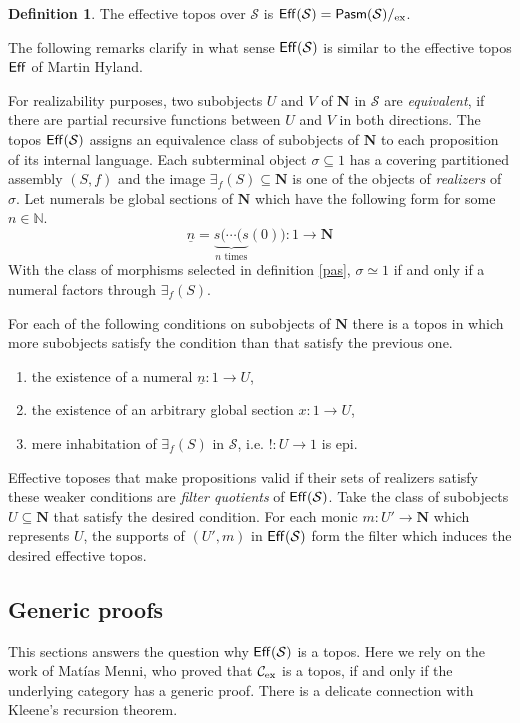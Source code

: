 \documentclass{amsart}
\theoremstyle{plain}
\theoremstyle{definition}
\newtheorem{defin}[theorem]{Definition}
\newcommand\hide[1]{}
\newcommand\cat\mathcal
\newcommand\XN{\mathbb N}
\newcommand\N{\mathbf N}
\begin{document}
\begin{defin} The effective topos over $\cat S$ is $\Eff(\cat S) = \pasm(\cat S)/\ex$. \end{defin}

The following remarks clarify in what sense $\Eff(\cat S)$ is similar to the effective topos $\mathsf{Eff}$ of Martin Hyland.

For realizability purposes, two subobjects $U$ and $V$ of $\N$ in $\cat S$ are \emph{equivalent}, if there are partial recursive functions between $U$ and $V$ in both directions. The topos $\Eff(\cat S)$ assigns an equivalence class of subobjects of $\N$ to each proposition of its internal language. Each subterminal object $\sigma\subseteq 1$ has a covering partitioned assembly $(S,f)$ and the image $\exists_f(S)\subseteq \N$ is one of the objects of \emph{realizers} of $\sigma$. Let numerals be global sections of $\N$ which have the following form for some $n\in \XN$. 
\[ \underline n = \underbrace{s(\dotsm(s}_{n\textrm{ times}}(0)):1\to \N \]
With the class of morphisms selected in definition \ref{pas}, $\sigma \simeq 1$ if and only if a numeral factors through $\exists_f(S)$.

For each of the following conditions on subobjects of $\N$ there is a topos in which more subobjects satisfy the condition than that satisfy the previous one.
\begin{enumerate}
\item the existence of a numeral $\underline n:1\to U$,  
\item the existence of an arbitrary global section $x:1\to U$,
\item mere inhabitation of $\exists_f(S)$ in $\cat S$, i.e. $!:U\to 1$ is epi.
\end{enumerate}

Effective toposes that make propositions valid if their sets of realizers satisfy these weaker conditions are \emph{filter quotients} of $\Eff(\cat S)$. %
Take the class of subobjects $U\subseteq \N$ that satisfy the desired condition. For each monic $m:U'\to \N$ which represents $U$, the supports of $(U',m)$ in $\Eff(\cat S)$ form the filter which induces the desired effective topos. %
\hide{global section behoudt niet altijd pca's, of wel? Wel als het globale pca's zijn, en dat durf ik wel te wedden.}

\hide{
Is het erg? Het heeft wel iets spannends.
Weet je wat, ik denk dat het prima zonder gaat.
}

\subsection{Generic proofs}
This sections answers the question why $\Eff(\cat S)$ is a topos. Here we rely on the work of Mat\'ias Menni, who proved that $\cat C\ex$ is a topos, if and only if the underlying category has a generic proof. There is a delicate connection with Kleene's recursion theorem.
\end{document}
